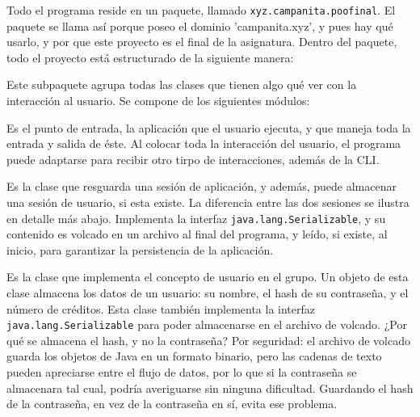 \documentclass[letterpaper,12pt]{article}
\begin{document}
Todo el programa reside en un paquete, llamado \texttt{xyz.campanita.poofinal}. El paquete se llama así porque poseo el dominio 'campanita.xyz', y pues hay qué usarlo, y por que este proyecto es el final de la asignatura. Dentro del paquete, todo el proyecto está estructurado de la siguiente manera:
\begin{description}[style=nextline]
\item[\texttt{.cliente}]
  Este subpaquete agrupa todas las clases que tienen algo qué ver con la interacción al usuario. Se compone de los siguientes módulos:
  \begin{description}[style=nextline]
  \item[\texttt{Cliente}]
    Es el punto de entrada, la aplicación que el usuario ejecuta, y que maneja toda la entrada y salida de éste. Al colocar toda la interacción del usuario, el programa puede adaptarse para recibir otro tirpo de interacciones, además de la CLI.
  \item[\texttt{Sesion}]
    Es la clase que resguarda una sesión de aplicación, y además, puede almacenar una sesión de usuario, si esta existe. La diferencia entre las dos sesiones se ilustra en detalle más abajo. Implementa la interfaz \texttt{java.lang.Serializable}, y su contenido es volcado en un archivo al final del programa, y leído, si existe, al inicio, para garantizar la persistencia de la aplicación.
  \item[\texttt{Usuario}]
    Es la clase que implementa el concepto de usuario en el grupo. Un objeto de esta clase almacena los datos de un usuario: su nombre, el hash de su contraseña, y el número de créditos. Esta clase también implementa la interfaz \texttt{java.lang.Serializable} para poder almacenarse en el archivo de volcado. ¿Por qué se almacena el hash, y no la contraseña? Por seguridad: el archivo de volcado guarda los objetos de Java en un formato binario, pero las cadenas de texto pueden apreciarse entre el flujo de datos, por lo que si la contraseña se almacenara tal cual, podría averiguarse sin ninguna dificultad. Guardando el hash de la contraseña, en vez de la contraseña en sí, evita ese problema.
  \end{description}


\end{description}
\end{document}
